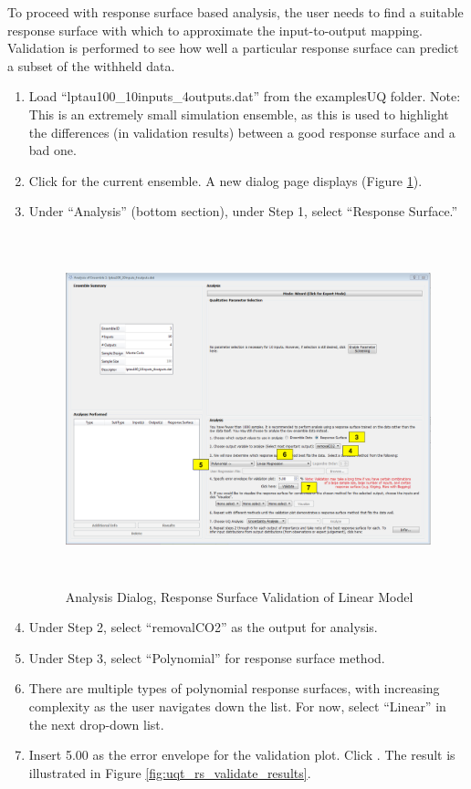 To proceed with response surface based analysis, the user needs to find a suitable response surface with which to approximate the input-to-output mapping. Validation is performed to see how well a particular response surface can predict a subset of the withheld data.
\begin{enumerate}
\item{Load ``lptau100\_10inputs\_4outputs.dat'' from the examples\bs UQ folder. Note: This is an extremely small simulation ensemble, as this is used to highlight the differences (in validation results) between a good response surface and a bad one.}
\item{Click  for the current ensemble. A new dialog page displays (Figure \ref{fig:uqt_rs_validate}).}
\item{Under ``Analysis'' (bottom section), under Step 1, select ``Response Surface.''
\begin{figure}[H]
\centering \includegraphics[width=6.5in,height=4in,keepaspectratio]{Chapt_uq/figs/tutorial/22_RSValidationScreen2}
\caption{Analysis Dialog, Response Surface Validation of Linear Model}
\label{fig:uqt_rs_validate}
\end{figure}
}
\item{Under Step 2, select ``removalCO2'' as the output for analysis.}
\item{Under Step 3, select ``Polynomial'' for response surface method.}
\item{There are multiple types of polynomial response surfaces, with increasing complexity as
the user navigates down the list. For now, select ``Linear'' in the next drop-down list.}
\item{Insert 5.00 as the error envelope for the validation plot. Click .  The result is illustrated in Figure \ref{fig:uqt_rs_validate_results}.}
\end{enumerate}

